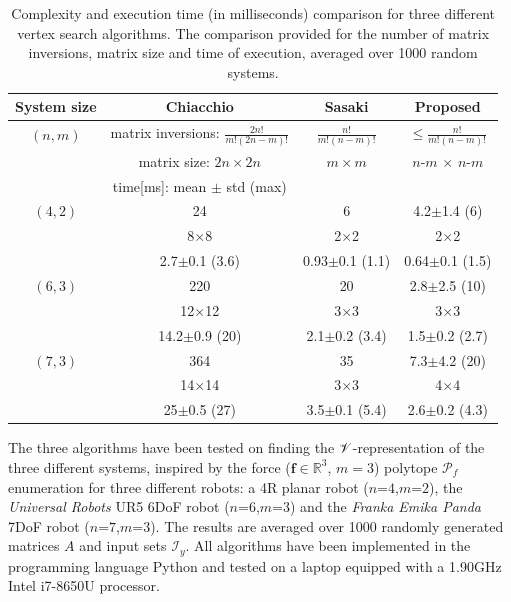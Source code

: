 \begin{table}[!h]
    \centering
    \caption{Complexity and execution time (in milliseconds) comparison for three different vertex search algorithms. The comparison provided for the number of matrix inversions, matrix size and time of execution, averaged over 1000 random systems. }
    \begin{tabular}{|c|c|c|c|}
       \hline
      \textbf{ System size }& \textbf{Chiacchio}\cite{chiacchio_evaluation_1996} & \textbf{Sasaki} \cite{sasaki_vertex_nodate}  &  \textbf{Proposed} \\
       \hline
       $(n,m)$& matrix inversions: $ \frac{2n!}{m!(2n-m)!}$  & $ \frac{n!}{m!(n-m)!} $ & $ \leq \frac{n!}{m!(n-m)!}$ \\
       &  matrix size:  $ 2n \times 2n$ & $m\times m$  & $n$-$m$ $\times$ $n$-$m$\\
       & time[ms]: mean $\pm$ std (max) & & \\
       \hline
       $(4,2)$ &  24 & 6 & 4.2$\pm$1.4 (6) \\ 
       & 8$\times$8 & 2$\times$2 & 2$\times$2 \\ 
       & 2.7$\pm$0.1 (3.6) & 0.93$\pm$0.1 (1.1) & 0.64$\pm$0.1 (1.5) \\ 
       \hline
       $(6,3)$ & 220 & 20 & 2.8$\pm$2.5 (10) \\ 
        & 12$\times$12 & 3$\times$3 & 3$\times$3 \\ 
       & 14.2$\pm$0.9 (20) & 2.1$\pm$0.2 (3.4) & 1.5$\pm$0.2 (2.7) \\ 
       \hline
      $(7,3)$&    364 & 35 & 7.3$\pm$4.2 (20)\\
        & 14$\times$14 & 3$\times$3 & 4$\times4$\\
       & 25$\pm$0.5 (27) & 3.5$\pm$0.1 (5.4) & 2.6$\pm$0.2 (4.3)\\

       \hline
    \end{tabular}
    \label{tab:complexity_results}
\end{table}


The three algorithms have been tested on finding the $\mathscr{V}$-representation of the three different systems, inspired by the force ($\bm{f}\in\mathbb{R}^3$, $m=3$) polytope $\mathcal{P}_f$ enumeration for three different robots: a 4R planar robot ($n$=$4$,$m$=$2$), the \textit{Universal Robots} UR5 6DoF robot ($n$=$6$,$m$=$3$) and the \textit{Franka Emika Panda} 7DoF robot ($n$=$7$,$m$=$3$). The results are averaged over 1000 randomly generated matrices $A$ and input sets $\mathcal{I}_y$. All algorithms have been implemented in the programming language Python and tested on a laptop equipped with a 1.90GHz Intel i7-8650U processor. 

